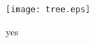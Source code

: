 \documentclass[12pt]{article}
\begin{document}
\begin{figure}
\centering
\texttt{[image: tree.eps]}
\caption{yes}
\label{1}
\end{figure}
\end{document}

